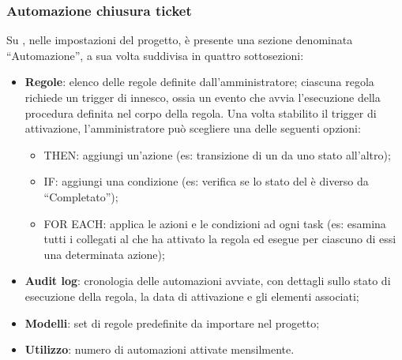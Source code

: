 \subsubsection{Automazione chiusura ticket}
\par Su , nelle impostazioni del progetto, è presente una sezione denominata “Automazione”, a sua volta suddivisa in quattro sottosezioni:
\begin{itemize}
  \item \textbf{Regole}: elenco delle regole definite dall'amministratore; ciascuna regola richiede un trigger di innesco, ossia un evento che avvia l'esecuzione della procedura definita nel corpo della regola. Una volta stabilito il trigger di attivazione, l’amministratore può scegliere una delle seguenti opzioni:
  \begin{itemize}
    \item THEN: aggiungi un'azione (es: transizione di un  da uno stato all'altro);
    \item IF: aggiungi una condizione (es: verifica se lo stato del  è diverso da “Completato”);
    \item FOR EACH: applica le azioni e le condizioni ad ogni task (es: esamina tutti i  collegati al  che ha attivato la regola ed esegue per ciascuno di essi una determinata azione);
  \end{itemize}
  \item \textbf{Audit log}: cronologia delle automazioni avviate, con dettagli sullo stato di esecuzione della regola, la data di attivazione e gli elementi associati;
  \item \textbf{Modelli}: set di regole predefinite da importare nel progetto;
  \item \textbf{Utilizzo}: numero di automazioni attivate mensilmente.
\end{itemize}

